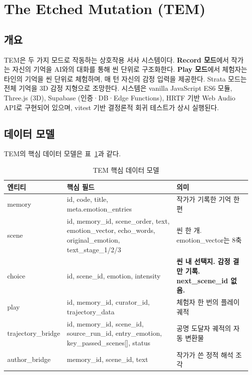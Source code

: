 \documentclass[11pt, a4paper]{article}
\begin{document}
\section{The Etched Mutation (TEM)}

\subsection{개요}

TEM은 두 가지 모드로 작동하는 상호작용 서사 시스템이다. \textbf{Record 모드}에서 작가는 자신의 기억을 AI와의 대화를 통해 씬 단위로 구조화한다. \textbf{Play 모드}에서 체험자는 타인의 기억을 씬 단위로 체험하며, 매 턴 자신의 감정 입력을 제공한다. Strata 모드는 전체 기억을 3D 감정 지형으로 조망한다. 시스템은 vanilla JavaScript ES6 모듈, Three.js (3D), Supabase (인증·DB·Edge Functions), HRTF 기반 Web Audio API로 구현되어 있으며, vitest 기반 결정론적 회귀 테스트가 상시 실행된다.

\subsection{데이터 모델}

TEM의 핵심 데이터 모델은 표~\ref{tab:datamodel}과 같다.

\begin{table}[H]
\centering
\caption{TEM 핵심 데이터 모델}
\label{tab:datamodel}
\small
\begin{tabular}{l p{6.4cm} p{4.4cm}}
\toprule
\textbf{엔티티} & \textbf{핵심 필드} & \textbf{의미} \\
\midrule
memory & id, code, title, meta.emotion\_entries & 작가가 기록한 기억 한 편 \\
scene & id, memory\_id, scene\_order, text, emotion\_vector, echo\_words, original\_emotion, text\_stage\_1/2/3 & 씬 한 개. emotion\_vector는 8축 \\
choice & id, scene\_id, emotion, intensity & \textbf{씬 내 선택지. 감정 결만 기록. next\_scene\_id 없음.} \\
play & id, memory\_id, curator\_id, trajectory\_data & 체험자 한 번의 플레이 궤적 \\
trajectory\_bridge & id, memory\_id, scene\_id, source\_run\_id, entry\_emotion, key\_passed\_scenes[], status & 공명 도달자 궤적의 자동 변환물 \\
author\_bridge & memory\_id, scene\_id, text & 작가가 쓴 정적 해석 조각 \\
\bottomrule
\end{tabular}
\end{table}
\end{document}
